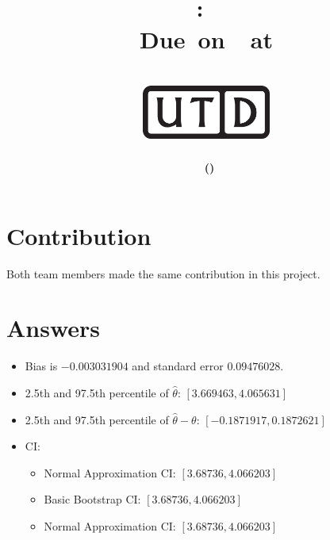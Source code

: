 \documentclass[11pt,letterpaper,titlepage,en-US]{article}
\title{
    \vspace{1in}
    \textmd{\textbf{\hmwkClassName \\\hmwkClass:\ \hmwkTitle }}\\
    \normalsize\vspace{0.1in}\small{Due\ on\ \DTMusedate{DueDate}\ at \DTMusetime{DueDate} }\\
    \vspace{0.1in}\large{\textit{\hmwkClassInstructor}}\\
    \vspace{0.5in}\includegraphics[height=2.4em]{UTD_logo_BW}\\
    \vspace{2in}
}
\author{\textbf{\hmwkAuthorName\ \footnotesize{(\hmwkAuthorNetID)}} \\ }
\date{}
\begin{document}
\maketitle

\tableofcontents
\pagebreak
{}

\section*{Contribution}
Both team members made the same contribution in this project.

\section{Answers}
\begin{itemize}
    \item Bias is $-0.003031904$ and standard error $0.09476028$.
    \item 2.5th and 97.5th percentile of $\hat{\theta}$: $[3.669463, 4.065631]$
    \item 2.5th and 97.5th percentile of $\hat{\theta} - \theta$: $[-0.1871917, 0.1872621]$
    \item CI:
    \begin{itemize}
        \item Normal Approximation CI: $[3.68736, 4.066203]$
        \item Basic Bootstrap CI: $[3.68736, 4.066203]$
        \item Normal Approximation CI: $[3.68736, 4.066203]$
    \end{itemize}
\end{itemize}
\end{document}
